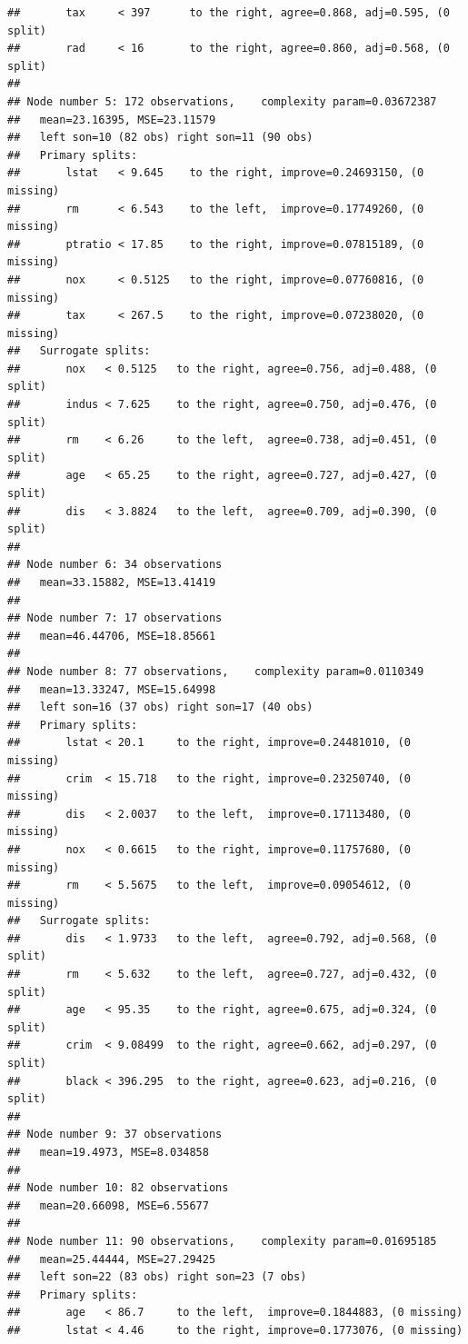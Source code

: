 \documentclass[
]{book}
\theoremstyle{plain}
\theoremstyle{definition}
\theoremstyle{definition}
\theoremstyle{definition}
\theoremstyle{definition}
\theoremstyle{definition}
\theoremstyle{remark}
\begin{document}
\begin{verbatim}
##       tax     < 397      to the right, agree=0.868, adj=0.595, (0 split)
##       rad     < 16       to the right, agree=0.860, adj=0.568, (0 split)
## 
## Node number 5: 172 observations,    complexity param=0.03672387
##   mean=23.16395, MSE=23.11579 
##   left son=10 (82 obs) right son=11 (90 obs)
##   Primary splits:
##       lstat   < 9.645    to the right, improve=0.24693150, (0 missing)
##       rm      < 6.543    to the left,  improve=0.17749260, (0 missing)
##       ptratio < 17.85    to the right, improve=0.07815189, (0 missing)
##       nox     < 0.5125   to the right, improve=0.07760816, (0 missing)
##       tax     < 267.5    to the right, improve=0.07238020, (0 missing)
##   Surrogate splits:
##       nox   < 0.5125   to the right, agree=0.756, adj=0.488, (0 split)
##       indus < 7.625    to the right, agree=0.750, adj=0.476, (0 split)
##       rm    < 6.26     to the left,  agree=0.738, adj=0.451, (0 split)
##       age   < 65.25    to the right, agree=0.727, adj=0.427, (0 split)
##       dis   < 3.8824   to the left,  agree=0.709, adj=0.390, (0 split)
## 
## Node number 6: 34 observations
##   mean=33.15882, MSE=13.41419 
## 
## Node number 7: 17 observations
##   mean=46.44706, MSE=18.85661 
## 
## Node number 8: 77 observations,    complexity param=0.0110349
##   mean=13.33247, MSE=15.64998 
##   left son=16 (37 obs) right son=17 (40 obs)
##   Primary splits:
##       lstat < 20.1     to the right, improve=0.24481010, (0 missing)
##       crim  < 15.718   to the right, improve=0.23250740, (0 missing)
##       dis   < 2.0037   to the left,  improve=0.17113480, (0 missing)
##       nox   < 0.6615   to the right, improve=0.11757680, (0 missing)
##       rm    < 5.5675   to the left,  improve=0.09054612, (0 missing)
##   Surrogate splits:
##       dis   < 1.9733   to the left,  agree=0.792, adj=0.568, (0 split)
##       rm    < 5.632    to the left,  agree=0.727, adj=0.432, (0 split)
##       age   < 95.35    to the right, agree=0.675, adj=0.324, (0 split)
##       crim  < 9.08499  to the right, agree=0.662, adj=0.297, (0 split)
##       black < 396.295  to the right, agree=0.623, adj=0.216, (0 split)
## 
## Node number 9: 37 observations
##   mean=19.4973, MSE=8.034858 
## 
## Node number 10: 82 observations
##   mean=20.66098, MSE=6.55677 
## 
## Node number 11: 90 observations,    complexity param=0.01695185
##   mean=25.44444, MSE=27.29425 
##   left son=22 (83 obs) right son=23 (7 obs)
##   Primary splits:
##       age   < 86.7     to the left,  improve=0.1844883, (0 missing)
##       lstat < 4.46     to the right, improve=0.1773076, (0 missing)

\end{verbatim}
\end{document}
